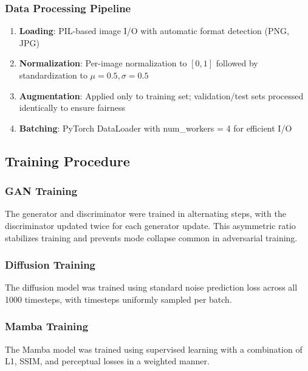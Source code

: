 \documentclass[10pt,conference,letterpaper]{IEEEtran}
\begin{document}
\subsubsection{Data Processing Pipeline}

\begin{enumerate}
  \item \textbf{Loading}: PIL-based image I/O with automatic format detection (PNG, JPG)
  
  \item \textbf{Normalization}: Per-image normalization to $[0, 1]$ followed by standardization to $\mu = 0.5, \sigma = 0.5$
  
  \item \textbf{Augmentation}: Applied only to training set; validation/test sets processed identically to ensure fairness
  
  \item \textbf{Batching}: PyTorch DataLoader with num\_workers = 4 for efficient I/O
\end{enumerate}

\subsection{Training Procedure}

\subsubsection{GAN Training}

The generator and discriminator were trained in alternating steps, with the discriminator updated twice for each generator update. This asymmetric ratio stabilizes training and prevents mode collapse common in adversarial training.

\subsubsection{Diffusion Training}

The diffusion model was trained using standard noise prediction loss across all 1000 timesteps, with timesteps uniformly sampled per batch.

\subsubsection{Mamba Training}

The Mamba model was trained using supervised learning with a combination of L1, SSIM, and perceptual losses in a weighted manner.
\end{document}
